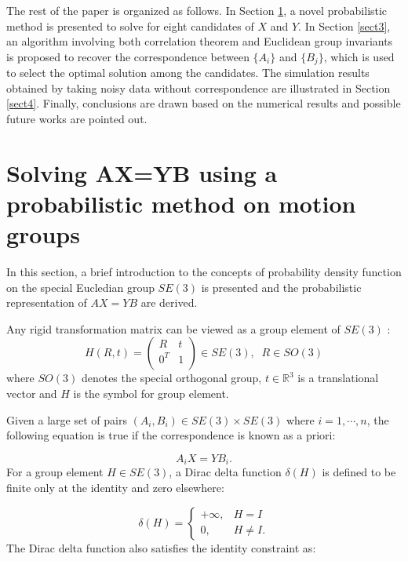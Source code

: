 \documentclass[letterpaper, 10 pt, conference]{ieeeconf}  %
\begin{document}
The rest of the paper is organized as follows. {\color{red}In Section
\ref{sect2}, a novel probabilistic method is presented to solve for eight candidates of $X$ and $Y$.} In Section \ref{sect3}, an algorithm involving both correlation theorem and Euclidean group invariants is proposed to recover the correspondence between $\{A_i\}$ and $\{B_j\}$, {\color{red} which is used to select the optimal solution among the candidates}. The simulation results obtained by taking noisy data without correspondence are illustrated in Section \ref{sect4}. Finally, conclusions are drawn based on the numerical results and possible future works are pointed out.

\section{Solving AX=YB using a probabilistic method on motion groups}
\label{sect2}
In this section, a brief introduction to the concepts of probability density function on the special Eucledian group $SE(3)$ is presented and the probabilistic representation of $AX=YB$ are derived.

Any rigid transformation matrix can be viewed as a group element of $SE(3)$ :
\begin{equation}\label{equ0}
    H(R,t)=\left(
             \begin{array}{cc}
               R & t \\
               0^{T} & 1 \\
             \end{array}
           \right) \in SE(3), \; \; R \in SO(3)
\end{equation}
where $SO(3)$ denotes the special orthogonal group, $t \in \mathbb{R}^3 $ is a translational vector and $H$ is the symbol for group element.

Given a large set of pairs $(A_{i},B_{i})\in SE(3)\times SE(3)$ where $i=1,\cdots,n$, the following equation is true if the correspondence is known as a priori:

\begin{equation}\label{equ1}
A_{i}X=YB_{i}.
\end{equation}
For a group element $H \in SE(3)$, a Dirac delta function $\delta(H)$ is defined to be finite only at the identity and zero elsewhere:

\begin{equation}\label{equ2}
\delta{(H)}=
\left\{
\begin{array}{ll}
+\infty, & H=I \\
0, & H \neq I.
\end{array}
\right.
\end{equation}
The Dirac delta function also satisfies the identity constraint as:
\end{document}

